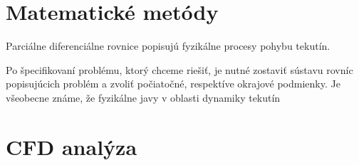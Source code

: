 \documentclass[]{tukediphc}
\begin{document}
%
%
%

\section{Matematické metódy}

Parciálne diferenciálne rovnice popisujú fyzikálne procesy pohybu tekutín.

Po špecifikovaní problému, ktorý chceme riešiť, je nutné zostaviť sústavu rovníc popisujúcich problém a zvoliť počiatočné, respektíve okrajové podmienky. Je všeobecne známe, že fyzikálne javy v oblasti dynamiky tekutín


\section{CFD analýza}
\end{document}
